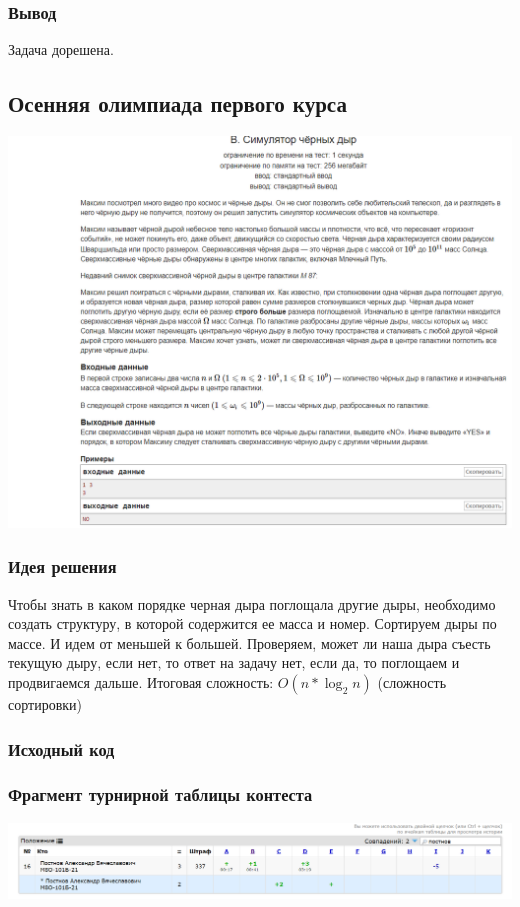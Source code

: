 \subsubsection*{Вывод}
Задача дорешена.

\vspace{20pt}

\pagebreak

\subsection*{Осенняя олимпиада первого курса}
\begin{center}
\includegraphics[width=\textwidth]{statements/11.png}
\end{center}
\subsubsection*{Идея решения}
Чтобы знать в каком порядке черная дыра поглощала другие дыры, необходимо создать структуру, в которой содержится ее масса и номер. Сортируем дыры по массе. И идем от меньшей к большей. Проверяем, может ли наша дыра съесть текущую дыру, если нет, то ответ на задачу нет, если да, то поглощаем и продвигаемся дальше. Итоговая сложность: $O(n*\log_{2} n)$ (сложность сортировки)
\subsubsection*{Исходный код}


\subsubsection*{Фрагмент турнирной таблицы контеста}
\begin{center}
\includegraphics[width=\textwidth]{standings/11.png}\newline\noindent
\end{center}

